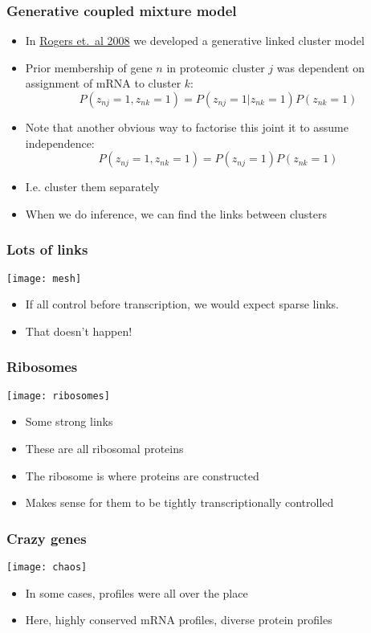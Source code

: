 \begin{frame}
	\frametitle{Generative coupled mixture model}
	\begin{itemize}
		\item In \href{http://dx.doi.org/10.1093/bioinformatics/btn553}{Rogers et.~al 2008} we developed a generative linked cluster model
		\item Prior membership of gene $n$ in proteomic cluster $j$ was dependent on assignment of mRNA to cluster $k$:
		\[
		P(z_{nj}=1,z_{nk}=1) = P(z_{nj}=1|z_{nk}=1)P(z_{nk}=1)
		\]
		\item<2->Note that another obvious way to factorise this joint it to assume independence:
		\[
		P(z_{nj}=1,z_{nk}=1) = P(z_{nj}=1)P(z_{nk}=1)
		\]
		\item<2->I.e. cluster them separately
		\item<3->When we do inference, we can find the links between clusters
	\end{itemize}
	
\end{frame}

\begin{frame}
	\frametitle{Lots of links}
	\texttt{[image: mesh]}
	\begin{itemize}
		\item If all control before transcription, we would expect sparse links.
		\item That doesn't happen!
	\end{itemize}
\end{frame}

\begin{frame}
	\frametitle{Ribosomes}
		\texttt{[image: ribosomes]}
		\begin{itemize}
			\item Some strong links
			\item These are all ribosomal proteins
			\item The ribosome is where proteins are constructed
			\item Makes sense for them to be tightly transcriptionally controlled
		\end{itemize}
\end{frame}

\begin{frame}
	\frametitle{Crazy genes}
	\texttt{[image: chaos]}
	\begin{itemize}
		\item In some cases, profiles were all over the place
		\item Here, highly conserved mRNA profiles, diverse protein profiles
	\end{itemize}
\end{frame}

